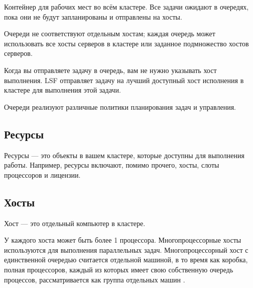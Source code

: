 Контейнер для рабочих мест во всём кластере. Все задачи ожидают в очередях, пока они не будут запланированы и отправлены на хосты.

Очереди не соответствуют отдельным хостам; каждая очередь может использовать все хосты серверов в кластере или заданное подмножество хостов серверов.

Когда вы отправляете задачу в очередь, вам не нужно указывать хост выполнения. LSF отправляет задачу на лучший доступный хост исполнения в кластере для выполнения этой задачи.

Очереди реализуют различные политики планирования задач и управления.

\subsection{Ресурсы}

Ресурсы --- это объекты в вашем кластере, которые доступны для выполнения работы. Например, ресурсы включают, помимо прочего, хосты, слоты процессоров и лицензии.

\lstset{emphstyle=\itshape}
\subsection{Хосты}

Хост --- это отдельный компьютер в кластере.

У каждого хоста может быть более 1 процессора. Многопроцессорные хосты используются для выполнения параллельных задач. Многопроцессорный хост с единственной очередью считается отдельной машиной, в то время как коробка, полная процессоров, каждый из которых имеет свою собственную очередь процессов, рассматривается как группа отдельных машин \cite{hosts_about}.

